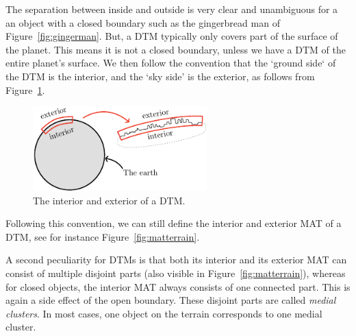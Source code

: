 The separation between inside and outside is very clear and unambiguous for a an object with a closed boundary such as the gingerbread man of Figure~\ref{fig:gingerman}.
But, a DTM typically only covers part of the surface of the planet.
This means it is not a closed boundary, unless we have a DTM of the entire planet's surface.
We then follow the convention that the `ground side` of the DTM is the interior, and the `sky side' is the exterior, as follows from Figure~\ref{fig:object_earth}.
\begin{figure}[tbp]
	\begin{center}
	\includegraphics[width=0.6\textwidth]{figs/object_earth.pdf}
	\caption{The interior and exterior of a DTM.}
	\label{fig:object_earth}
	\end{center}
\end{figure}
Following this convention, we can still define the interior and exterior MAT of a DTM, see for instance Figure~\ref{fig:matterrain}.

A second peculiarity for DTMs is that both its interior and its exterior MAT can consist of multiple disjoint parts (also visible in Figure~\ref{fig:matterrain}), whereas for closed objects, the interior MAT always consists of one connected part. 
This is again a side effect of the open boundary.
These disjoint parts are called \emph{medial clusters}.
In most cases, one object on the terrain corresponds to one medial cluster.


